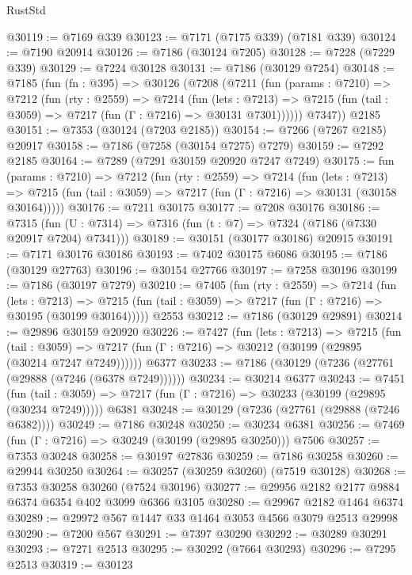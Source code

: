 \begin{lexlean}{RustStd}
\begin{coremodule}
{\begin{coremodule}
{{{{{{{{{{{{{{{{{{{{{{{{{{{{{{{{@30119 := @7169 @339
@30123 := @7171 (@7175 @339) (@7181 @339)
@30124 := @7190 @20914
@30126 := @7186 (@30124 @7205)
@30128 := @7228 (@7229 @339)
@30129 := @7224 @30128
@30131 := @7186 (@30129 @7254)
@30148 := @7185
    (fun (fn : @395) =>
    @30126
      (@7208
        (@7211
          (fun (params : @7210) =>
          @7212
            (fun (rty : @2559) =>
            @7214
              (fun (lets : @7213) =>
              @7215 (fun (tail : @3059) => @7217 (fun (Γ : @7216) => @30131 @7301))))))
        @7347))
    @2185
@30151 := @7353 (@30124 (@7203 @2185))
@30154 := @7266 (@7267 @2185) @20917
@30158 := @7186 (@7258 (@30154 @7275) @7279)
@30159 := @7292 @2185
@30164 := @7289 (@7291 @30159 @20920 @7247 @7249)
@30175 := fun (params : @7210) =>
  @7212
    (fun (rty : @2559) =>
    @7214
      (fun (lets : @7213) =>
      @7215 (fun (tail : @3059) => @7217 (fun (Γ : @7216) => @30131 (@30158 @30164)))))
@30176 := @7211 @30175
@30177 := @7208 @30176
@30186 := @7315
    (fun (U : @7314) => @7316 (fun (t : @7) => @7324 (@7186 (@7330 @20917 @7204) @7341)))
@30189 := @30151 (@30177 @30186) @20915
@30191 := @7171 @30176 @30186
@30193 := @7402 @30175 @6086
@30195 := @7186 (@30129 @27763)
@30196 := @30154 @27766
@30197 := @7258 @30196
@30199 := @7186 (@30197 @7279)
@30210 := @7405
    (fun (rty : @2559) =>
    @7214
      (fun (lets : @7213) =>
      @7215 (fun (tail : @3059) => @7217 (fun (Γ : @7216) => @30195 (@30199 @30164)))))
    @2553
@30212 := @7186 (@30129 @29891)
@30214 := @29896 @30159 @20920
@30226 := @7427
    (fun (lets : @7213) =>
    @7215
      (fun (tail : @3059) =>
      @7217 (fun (Γ : @7216) => @30212 (@30199 (@29895 (@30214 @7247 @7249))))))
    @6377
@30233 := @7186 (@30129 (@7236 (@27761 (@29888 (@7246 (@6378 @7249))))))
@30234 := @30214 @6377
@30243 := @7451
    (fun (tail : @3059) => @7217 (fun (Γ : @7216) => @30233 (@30199 (@29895 (@30234 @7249)))))
    @6381
@30248 := @30129 (@7236 (@27761 (@29888 (@7246 @6382))))
@30249 := @7186 @30248
@30250 := @30234 @6381
@30256 := @7469 (fun (Γ : @7216) => @30249 (@30199 (@29895 @30250))) @7506
@30257 := @7353 @30248
@30258 := @30197 @27836
@30259 := @7186 @30258
@30260 := @29944 @30250
@30264 := @30257 (@30259 @30260) (@7519 @30128)
@30268 := @7353 @30258 @30260 (@7524 @30196)
@30277 := @29956 @2182 @2177 @9884 @6374 @6354 @402 @3099 @6366 @3105
@30280 := @29967 @2182 @1464 @6374
@30289 := @29972 @567 @1447 @33 @1464 @3053 @4566 @3079 @2513 @29998
@30290 := @7200 @567
@30291 := @7397 @30290
@30292 := @30289 @30291
@30293 := @7271 @2513
@30295 := @30292 (@7664 @30293)
@30296 := @7295 @2513
@30319 := @30123
}}}}}}}}}}}}}}}}}}}}}}}}}}}}}}}}
\end{coremodule}}
\end{coremodule}
\end{lexlean}
